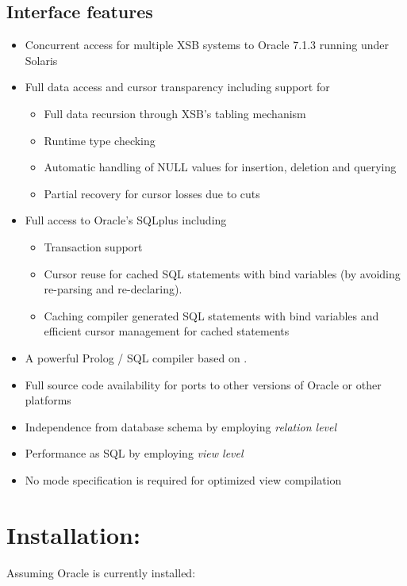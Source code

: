 \subsection{Interface features}
\begin{itemize} 
\item Concurrent access for multiple XSB systems to Oracle 7.1.3
	running under Solaris
\item Full data access and cursor transparency including support for
	\begin{itemize}
	\item Full data recursion through XSB's tabling mechanism
	\item Runtime type checking
	\item Automatic handling of NULL values for insertion, 
		deletion and querying
	\item Partial recovery for cursor losses due to cuts
	\end{itemize}
\item Full access to Oracle's SQLplus including
	\begin{itemize}
	\item Transaction support
	\item Cursor reuse for cached SQL statements 
		with bind variables (by avoiding re-parsing and re-declaring).
	\item Caching compiler generated SQL statements with bind variables 
		and efficient cursor management for cached statements
	\end{itemize}
\item A powerful Prolog / SQL compiler based on \cite{Drax92}.
\item Full source code availability for ports to other versions of
      Oracle or other platforms
\item Independence from database schema by employing {\it relation level}
\item Performance as SQL by employing {\it view level} 
\item No mode specification is required for optimized view compilation
\end{itemize}

\section{Installation:}

Assuming Oracle is currently installed:

